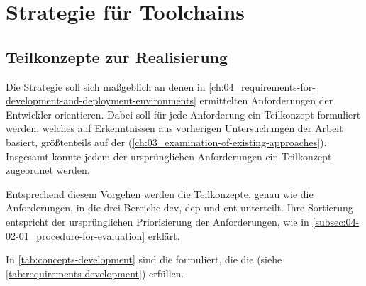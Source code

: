 \section{Strategie für Toolchains}
\label{sec:05-02_strategy-for-toolchains}

\subsection{Teilkonzepte zur Realisierung}
\label{subsec:05-02-01_sub-concepts-for-implementation}

Die  Strategie soll sich maßgeblich an denen in \autoref{ch:04_requirements-for-development-and-deployment-environments} ermittelten Anforderungen der Entwickler orientieren. Dabei soll für jede Anforderung ein Teilkonzept formuliert werden, welches auf Erkenntnissen aus vorherigen Untersuchungen der Arbeit basiert, größtenteils auf der  (\autoref{ch:03_examination-of-existing-approaches}). Insgesamt konnte jedem der ursprünglichen Anforderungen ein Teilkonzept zugeordnet werden.

Entsprechend diesem Vorgehen werden die Teilkonzepte, genau wie die Anforderungen, in die drei Bereiche \Gls{dev}, \Gls{dep} und \Gls{cnt} unterteilt. Ihre Sortierung entspricht der ursprünglichen Priorisierung der Anforderungen, wie in \autoref{subsec:04-02-01_procedure-for-evaluation} erklärt.

In \autoref{tab:concepts-development} sind die  formuliert, die die  (siehe \autoref{tab:requirements-development}) erfüllen.

